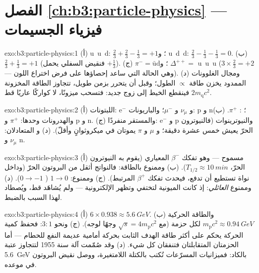 \section*{الفصل \ref{ch:b3:particle-physics} --- فيزياء الجسيمات}

\begin{solution}{exo:b3:particle-physics:1}
(أ) u~u~d: $\tfrac23 + \tfrac23 - \tfrac13 = +1$؛ و u~d~d: $\tfrac23 -
\tfrac13 - \tfrac13 = 0$. (ب) $\tfrac23 + \tfrac13 = +1$ (فنقيض
السفلي يحمل $+\tfrac13$). (ج) $\pi^- =
\bar{\text{u}}\text{d}$؛ و $\Delta^{++} = $ u~u~u ($3\times\tfrac23 =
+2$ --- وهي الحالة التي ساعد إحصاؤها على فرض اختراع
اللون). (د) ومجال الغلوونات الممدود يخزن طاقة
$\propto$ الطول؛ وقبل أن يتحرر  بزمن طويل، تتجاوز الطاقة المخزونة
$2m_{\text{q}}c^2$ فينقطع الخيط إلى زوج جديد:
فتسحب ميزونًا، لا كواركًا عاريًا قط.
\end{solution}

\begin{solution}{exo:b3:particle-physics:2}
(أ) اللبتونات: e$^-$ و $\nu_\mu$ و $\mu^-$؛ والباريونات: p و n؛ :
$\pi^+$. (ب) والهدرونات وحدها: $\pi^+$ و p و n. (ج) والمستقر منفردًا:
e$^-$ و p والنيوترينوات (فالنيوترون الحرّ يعيش خمس عشرة
دقيقة؛ و $\mu$ و $\pi$ يموتان في ميكروثوانٍ وأقلّ). (د) و
المتعادلان: $\nu_\mu$ و n.
\end{solution}

\begin{solution}{exo:b3:particle-physics:3}
(أ) مسموح --- وهو تفكك $\beta^-$ المعياري (يقوم به النيوترون الحرّ،
$T_{1/2} \approx \qty{10}{min}$). (ب) وممنوع بالطاقة:
فالنواتج أثقل من البروتون الحرّ (وداخل نواة تستطيع 
أن تدفع، فيحدث تفكك $\beta^+$ المرتبط). (ج)
وممنوع:  $1 \to 0$ (
$0 \to -1$). (د) وممنوع  \emph{العائلي}:
إذ كانت الميونية لتختفي وتظهر الإلكترونية --- ولم يُشاهَد
قط، ويُصطاد لهذا السبب بالضبط.
\end{solution}

\begin{solution}{exo:b3:particle-physics:4}
(أ) $6\times0.938 \approx \qty{5.6}{GeV}$. (ب) والطاقة الحركية
$m_{\text{p}}c^2 \approx \qty{0.94}{GeV}$ لكل حزمة
(مع $\sqrt s = 4m_{\text{p}}c^2$ وجهًا لوجه). (ج) ونحو $3:1$:
فحفظ كمية الحركة يحكم على أكثر طاقة الهدف الثابت
بحركة أمامية عديمة النفع للحطام --- أما الحزمتان المتقابلتان فتنفقان
كل شيء. (د) وقد صُمّمت آلة سنة 1955 لتتجاوز عتبة
\qty{5.6}{GeV} بالكاد: فميزانيات المسرّعات تُكتب
بالكتلة اللامتغيرة، ووصل نقيض البروتون في موعده.
\end{solution}

